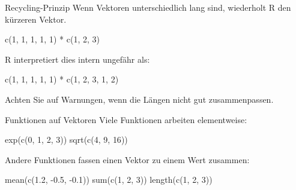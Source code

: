 \documentclass[
  10pt,
  ignorenonframetext,
  aspectratio=169,
]{beamer}
\newenvironment{Shaded}{}{}
\newcommand{\DecValTok}[1]{\textcolor[rgb]{0.25,0.63,0.44}{#1}}
\newcommand{\FloatTok}[1]{\textcolor[rgb]{0.25,0.63,0.44}{#1}}
\newcommand{\FunctionTok}[1]{\textcolor[rgb]{0.02,0.16,0.49}{#1}}
\newcommand{\NormalTok}[1]{#1}
\newcommand{\SpecialCharTok}[1]{\textcolor[rgb]{0.25,0.44,0.63}{#1}}
\begin{document}
\begin{frame}[fragile]{Recycling-Prinzip}
\label{recycling-prinzip}
Wenn Vektoren unterschiedlich lang sind, wiederholt R den kürzeren
Vektor.

\begin{Shaded}
\begin{Highlighting}[]
\FunctionTok{c}\NormalTok{(}\DecValTok{1}\NormalTok{, }\DecValTok{1}\NormalTok{, }\DecValTok{1}\NormalTok{, }\DecValTok{1}\NormalTok{, }\DecValTok{1}\NormalTok{) }\SpecialCharTok{*} \FunctionTok{c}\NormalTok{(}\DecValTok{1}\NormalTok{, }\DecValTok{2}\NormalTok{, }\DecValTok{3}\NormalTok{)}
\end{Highlighting}
\end{Shaded}

R interpretiert dies intern ungefähr als:

\begin{Shaded}
\begin{Highlighting}[]
\FunctionTok{c}\NormalTok{(}\DecValTok{1}\NormalTok{, }\DecValTok{1}\NormalTok{, }\DecValTok{1}\NormalTok{, }\DecValTok{1}\NormalTok{, }\DecValTok{1}\NormalTok{) }\SpecialCharTok{*} \FunctionTok{c}\NormalTok{(}\DecValTok{1}\NormalTok{, }\DecValTok{2}\NormalTok{, }\DecValTok{3}\NormalTok{, }\DecValTok{1}\NormalTok{, }\DecValTok{2}\NormalTok{)}
\end{Highlighting}
\end{Shaded}

Achten Sie auf Warnungen, wenn die Längen nicht gut zusammenpassen.
\end{frame}

\begin{frame}[fragile]{Funktionen auf Vektoren}
\label{funktionen-auf-vektoren}
Viele Funktionen arbeiten elementweise:

\begin{Shaded}
\begin{Highlighting}[]
\FunctionTok{exp}\NormalTok{(}\FunctionTok{c}\NormalTok{(}\DecValTok{0}\NormalTok{, }\DecValTok{1}\NormalTok{, }\DecValTok{2}\NormalTok{, }\DecValTok{3}\NormalTok{))}
\FunctionTok{sqrt}\NormalTok{(}\FunctionTok{c}\NormalTok{(}\DecValTok{4}\NormalTok{, }\DecValTok{9}\NormalTok{, }\DecValTok{16}\NormalTok{))}
\end{Highlighting}
\end{Shaded}

Andere Funktionen fassen einen Vektor zu einem Wert zusammen:

\begin{Shaded}
\begin{Highlighting}[]
\FunctionTok{mean}\NormalTok{(}\FunctionTok{c}\NormalTok{(}\FloatTok{1.2}\NormalTok{, }\SpecialCharTok{{-}}\FloatTok{0.5}\NormalTok{, }\SpecialCharTok{{-}}\FloatTok{0.1}\NormalTok{))}
\FunctionTok{sum}\NormalTok{(}\FunctionTok{c}\NormalTok{(}\DecValTok{1}\NormalTok{, }\DecValTok{2}\NormalTok{, }\DecValTok{3}\NormalTok{))}
\FunctionTok{length}\NormalTok{(}\FunctionTok{c}\NormalTok{(}\DecValTok{1}\NormalTok{, }\DecValTok{2}\NormalTok{, }\DecValTok{3}\NormalTok{))}
\end{Highlighting}
\end{Shaded}
\end{frame}
\end{document}
